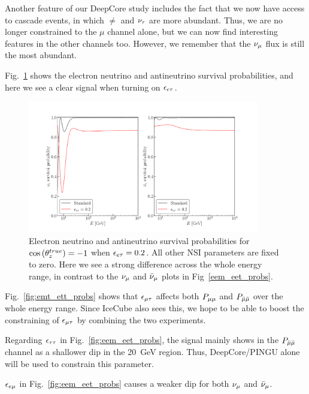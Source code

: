 Another feature of our DeepCore study includes the fact that we now have access to cascade events, in which $\ne$ and $\nu_\tau$ are more abundant.
Thus, we are no longer constrained to the $\mu$ channel alone, but we can now find interesting features in the other channels too. However, we 
remember that the $\nu_\mu$ flux is still the most abundant.

Fig.~\ref{fig:Pee_eet_probs} shows the electron neutrino and antineutrino survival probabilities, and here we see
a clear signal when turning on $\epsilon_{e\tau}$. 

\begin{figure}
    \begin{center}
        \includegraphics[width=0.9\textwidth]{figures/Pee_eet_probs.pdf}
        \caption{Electron neutrino and antineutrino survival probabilities for
        $\cos{(\theta_z^{true})} = -1$ when $\epsilon_{e\tau} = 0.2$. All other NSI parameters are fixed to zero. Here we see a strong difference across the whole energy range, in contrast to the $\nu_\mu$ and $\bar{\nu}_\mu$ plots in Fig~\ref{eem_eet_probs}.}
        \label{fig:Pee_eet_probs}
    \end{center}
\end{figure}

Fig.~\ref{fig:emt_ett_probs} shows that $\epsilon_{\mu\tau}$ affects both $P_{\mu\mu}$ and $P_{\bar{\mu} \bar{\mu}}$ over the whole energy range. Since 
IceCube also sees this, we hope to be able to boost the constraining of $\epsilon_{\mu\tau}$ by combining the two experiments.

Regarding $\epsilon_{\tau\tau}$ in Fig.~\ref{fig:eem_eet_probs}, the signal mainly shows in the $P_{\bar{\mu} \bar{\mu}}$ channel as
a shallower dip in the \SI{20}{\GeV} region. Thus, DeepCore/PINGU alone will be used to constrain this parameter.

$\epsilon_{e\mu}$ in Fig.~\ref{fig:eem_eet_probs} causes a weaker dip for both $\nu_\mu$ and $\bar{\nu}_\mu$. 


